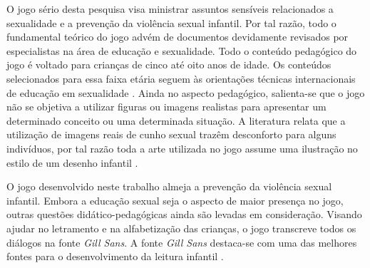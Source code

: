 O jogo sério desta pesquisa visa ministrar assuntos sensíveis relacionados a sexualidade e a prevenção da violência sexual infantil. Por tal razão, todo o fundamental teórico do jogo advém de documentos devidamente revisados por especialistas na área de educação e sexualidade. Todo o conteúdo pedagógico do jogo é voltado para crianças de cinco até oito anos de idade. Os conteúdos selecionados para essa faixa etária seguem às orientações técnicas internacionais de educação em sexualidade \cite{women2018international}. Ainda no aspecto pedagógico, salienta-se que o jogo não se objetiva a utilizar figuras ou imagens realistas para apresentar um determinado conceito ou uma determinada situação. A literatura relata que a utilização de imagens reais de cunho sexual trazêm desconforto para alguns indivíduos, por tal razão toda a arte utilizada no jogo assume uma ilustração no estilo de um desenho infantil \cite{jogo2020Albert}.


O jogo desenvolvido neste trabalho almeja a prevenção da violência sexual infantil. Embora a educação sexual seja o aspecto de maior presença no jogo, outras questões didático-pedagógicas ainda são levadas em consideração. Visando ajudar no letramento e na alfabetização das crianças, o jogo transcreve todos os diálogos na fonte \textit{Gill Sans}. A fonte \textit{Gill Sans} destaca-se com uma das melhores fontes para o desenvolvimento da leitura infantil \cite{lourencco2011tipografia}. 


